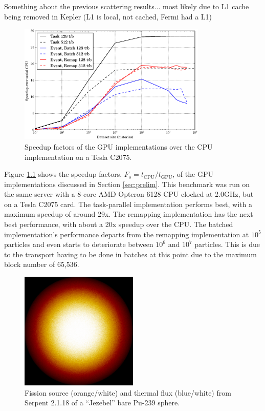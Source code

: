 \chapter{}
\label{app:A}

Something about the previous scattering results...  most likely due to L1 cache being removed in Kepler (L1 is local, not cached, Fermi had a L1)

\begin{figure}[h!] 
  \centering
    \includegraphics[width=0.8\textwidth]{graphics/prelim_speedup_old.eps}
     \caption{Speedup factors of the GPU implementations over the CPU implementation on a Tesla C2075. \label{prelim_speedup_old} }
\end{figure}

Figure \ref{prelim_speedup_old} shows the speedup factors, $F_s=t_\mathrm{CPU}/t_\mathrm{GPU}$, of the GPU implementations discussed in Section \ref{sec:prelim}.  This benchmark was run on the same server with a 8-core AMD Opteron 6128 CPU clocked at 2.0GHz, but on a Tesla C2075 card.  The task-parallel implementation performs best, with a maximum speedup of around 29x.  The remapping implementation has the next best performance, with about a 20x speedup over the CPU. The batched implementation's performance departs from the remapping implementation at $10^5$ particles and even starts to deteriorate between $10^6$ and $10^7$ particles.  This is due to the transport having to be done in batches at this point due to the maximum block number of 65,536.

\begin{figure}[h!] 
  \centering
    \includegraphics[width=0.5\textwidth]{graphics/finalresults/serpent-benchmark-6/godiva_mesh1.png}
     \caption{Fission source (orange/white) and thermal flux (blue/white) from Serpent 2.1.18 of a ``Jezebel'' bare Pu-239 sphere. \label{serp_godiva_mesh} }
\end{figure}

